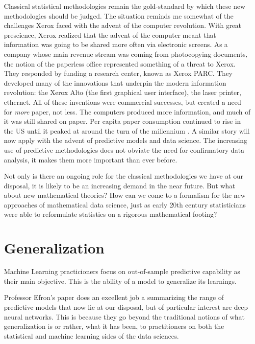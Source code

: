 \documentclass[a4paperpaper,]{article}
\begin{document}
Classical statistical methodologies remain the gold-standard by which
these new methodologies should be judged. The situation reminds me
somewhat of the challenges Xerox faced with the advent of the computer
revolution. With great prescience, Xerox realized that the advent of the
computer meant that information was going to be shared more often via
electronic screens. As a company whose main revenue stream was coming
from photocopying documents, the notion of the paperless office
represented something of a threat to Xerox. They responded by funding a
research center, known as Xerox PARC. They developed many of the
innovations that underpin the modern information revolution: the Xerox
Alto (the first graphical user interface), the laser printer, ethernet.
All of these inventions were commercial successes, but created a need
for \emph{more} paper, not less. The computers produced more
information, and much of it was still shared on paper. Per capita paper
consumption continued to rise in the US until it peaked at around the
turn of the millennium \citep{Andres:internet14}. A similar story will
now apply with the advent of predictive models and data science. The
increasing use of predictive methodologies does not obviate the need for
confirmatory data analysis, it makes them more important than ever
before.

Not only is there an ongoing role for the classical methodologies we
have at our disposal, it is likely to be an increasing demand in the
near future. But what about new mathematical theories? How can we come
to a formalism for the new approaches of mathematical data science, just
as early 20th century statisticians were able to reformulate statistics
on a rigorous mathematical footing?

\section{Generalization}

Machine Learning practicioners focus on out-of-sample predictive
capability as their main objective. This is the ability of a model to
generalize its learnings.

Professor Efron's paper does an excellent job a summarizing the range of
predictive models that now lie at our disposal, but of particular
interest are deep neural networks. This is because they go beyond the
traditional notions of what generalization is or rather, what it has
been, to practitioners on both the statistical and machine learning
sides of the data sciences.
\end{document}
